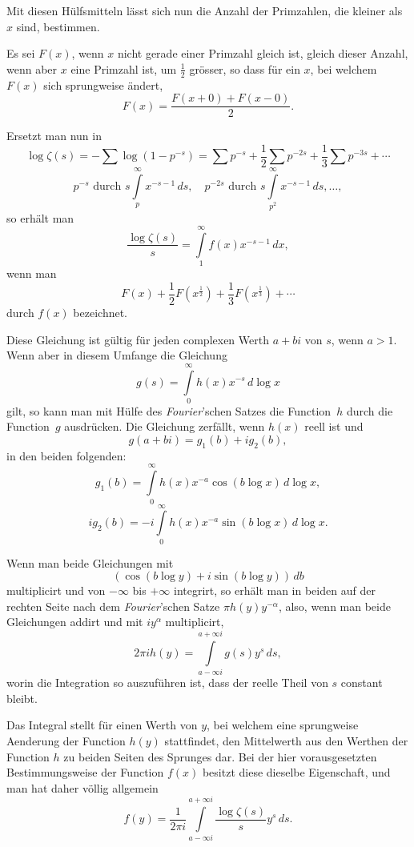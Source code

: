 \documentclass[a4paper,12pt]{article}
\begin{document}
Mit diesen H\"{u}lfsmitteln l\"{a}sst sich nun die Anzahl der
Primzahlen, die kleiner als $x$ sind, bestimmen.

Es sei $F(x)$, wenn $x$ nicht gerade einer Primzahl gleich ist,
gleich dieser Anzahl, wenn aber $x$ eine Primzahl ist, um
$\frac{1}{2}$ gr\"{o}sser, so dass f\"{u}r ein $x$, bei welchem
$F(x)$ sich sprungweise \"{a}ndert,
\[ F(x) = \frac{F(x + 0) + F(x - 0)}{2}.\]

Ersetzt man nun in
\[ \log \zeta(s) = - {\textstyle\sum} \log (1 - p^{-s})
   = {\textstyle\sum} p^{-s}
     + {\textstyle\frac{1}{2} \sum} p^{-2s}
     + {\textstyle\frac{1}{3} \sum} p^{-3s} + \cdots \]
\[ p^{-s}  \mbox{ durch } s\int\limits_p^\infty x^{-s-1}\,ds,\quad
   p^{-2s} \mbox{ durch } s\int\limits_{p^2}^\infty x^{-s-1}\,ds,\ldots,\]
so erh\"{a}lt man
\[ \frac{\log \zeta(s)}{s}
   = \int\limits_1^\infty f(x) x^{-s-1} \,dx,\]
wenn man
\[ F(x) + {\textstyle\frac{1}{2}} F(x^{\frac{1}{2}})
        + {\textstyle\frac{1}{3}} F(x^{\frac{1}{3}}) + \cdots \]
durch $f(x)$ bezeichnet.

Diese Gleichung ist g\"{u}ltig f\"{u}r jeden complexen Werth $a + bi$
von $s$, wenn $a > 1$.  Wenn aber in diesem Umfange die Gleichung
\[ g(s) = \int\limits_0^\infty h(x) x^{-s} \,d \log x \]
gilt, so kann man mit H\"{u}lfe des \emph{Fourier}'schen Satzes die
Function~$h$ durch die Function~$g$ ausdr\"{u}cken.  Die Gleichung
zerf\"{a}llt, wenn $h(x)$ reell ist und
\[ g(a + bi) = g_1(b) + i g_2(b),\]
in den beiden folgenden:
\[ g_1(b)   =    \int\limits_0^\infty h(x) x^{-a} \cos (b \log x) \,d \log x,\]
\[ i g_2(b) = -i \int\limits_0^\infty h(x) x^{-a} \sin (b \log x) \,d \log x.\]

Wenn man beide Gleichungen mit
\[ (\cos (b \log y) + i \sin (b \log y)) \,db \]
multiplicirt und von $-\infty$ bis $+\infty$ integrirt, so erh\"{a}lt
man in beiden auf der rechten Seite nach dem \emph{Fourier}'schen
Satze $\pi h(y) y^{-\alpha}$, also, wenn man beide Gleichungen addirt
und mit $i y^\alpha$ multiplicirt,
\[ 2\pi i h(y) = \int\limits_{a - \infty i}^{a + \infty i} g(s) y^s \,ds,\]
worin die Integration so auszuf\"{u}hren ist, dass der reelle Theil
von $s$ constant bleibt.

Das Integral stellt f\"{u}r einen Werth von $y$, bei welchem eine
sprungweise Aenderung der Function $h(y)$ stattfindet, den Mittelwerth
aus den Werthen der Function $h$ zu beiden Seiten des Sprunges dar.
Bei der hier vorausgesetzten Bestimmungsweise der Function $f(x)$
besitzt diese dieselbe Eigenschaft, und man hat daher v\"{o}llig
allgemein
\[ f(y) = \frac{1}{2\pi i} \int\limits_{a - \infty i}^{a + \infty i}
      \frac{\log \zeta(s)}{s} y^s \,ds.\]
\end{document}
